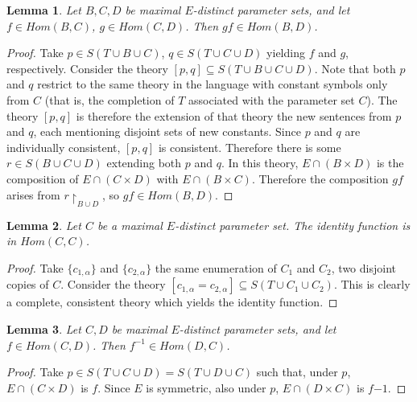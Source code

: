 \documentclass[letterpaper,twoside]{article}
\newtheorem{lemma}{Lemma}[theorem]
\theoremstyle{definition}
\theoremstyle{remark}
\begin{document}
\begin{lemma}\label{lemma-galoiscomposition}
  Let \(B,C,D\) be maximal \(E\)-distinct parameter sets, and let \(f
  \in Hom(B,C)\), \(g \in Hom(C,D)\).  Then \(gf \in Hom(B,D)\).
\end{lemma}
\begin{proof}
  Take \(p \in S(T \cup B \cup C)\), \(q \in S(T \cup C \cup D)\)
  yielding \(f\) and \(g\), respectively.  Consider the theory \([p,
    q] \subseteq S(T \cup B \cup C \cup D)\).  Note that both \(p\)
  and \(q\) restrict to the same theory in the language with constant
  symbols only from \(C\) (that is, the completion of \(T\) associated
  with the parameter set \(C\)).  The theory \([p,q]\) is therefore
  the extension of that theory the new sentences from \(p\) and \(q\),
  each mentioning disjoint sets of new constants.  Since \(p\) and
  \(q\) are individually consistent, \([p,q]\) is consistent.
  Therefore there is some \(r \in S(B \cup C \cup D)\) extending both
  \(p\) and \(q\).  In this theory, \(E \cap (B \times D)\) is the
  composition of \(E \cap (C \times D)\) with \(E \cap (B \times C)\).
  Therefore the composition \(gf\) arises from \(r \restriction_{B
    \cup D}\), so \(gf \in Hom(B,D)\).
\end{proof}

\begin{lemma}\label{lemma-galoisidentity}
  Let \(C\) be a maximal \(E\)-distinct parameter set.  The identity
  function is in \(Hom(C,C)\).
\end{lemma}
\begin{proof}
  Take \(\{c_{1,\alpha}\}\) and \(\{c_{2,\alpha}\}\) the same
  enumeration of \(C_1\) and \(C_2\), two disjoint copies of \(C\).
  Consider the theory \([c_{1,\alpha} = c_{2,\alpha}] \subseteq S(T
  \cup C_1 \cup C_2)\).  This is clearly a complete, consistent theory
  which yields the identity function.
\end{proof}

\begin{lemma}\label{lemma-galoisinverses}
  Let \(C, D\) be maximal \(E\)-distinct parameter sets, and let \(f
  \in Hom(C,D)\).  Then \(f^{-1} \in Hom(D,C)\).
\end{lemma}
\begin{proof}
  Take \(p \in S(T \cup C \cup D) = S(T \cup D \cup C)\) such that,
  under \(p\), \(E \cap (C \times D)\) is \(f\).  Since \(E\) is
  symmetric, also under \(p\), \(E \cap (D \times C)\) is \(f{-1}\).
\end{proof}
\end{document}
